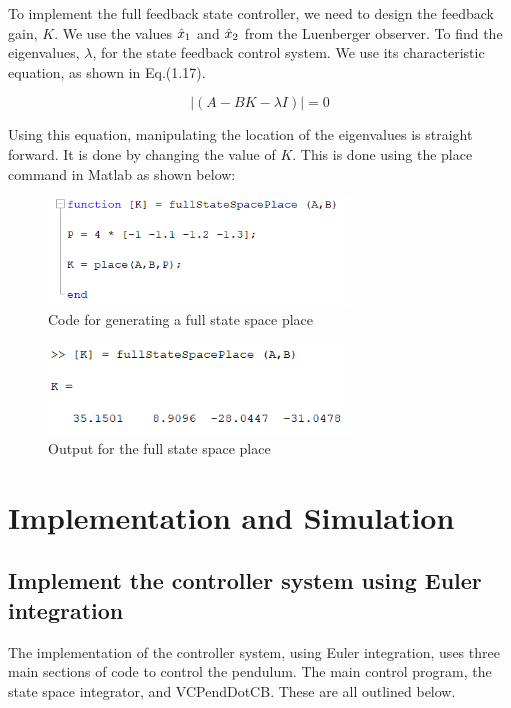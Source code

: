 \documentclass[11pt]{report}
\begin{document}
To implement the full feedback state controller, we need to design the feedback gain, $K$. We use the values $\hat{x}\textsubscript{1}$ and $\hat{x}\textsubscript{2}$ from the Luenberger observer. To find the eigenvalues, $\lambda$, for the state feedback control system. We use its characteristic equation, as shown in Eq.(1.17). 

\begin{equation}
|(A-BK-{\lambda}I)| = 0
\end{equation}

Using this equation, manipulating the location of the eigenvalues is straight forward. It is done by changing the value of $K$. This is done using the place command in Matlab as shown below:

\begin{figure}[H]
\centerline{\includegraphics[width=8cm]{fullStateSpacePlace.png}}
\caption{Code for generating a full state space place}
\label{fig}
\end{figure}

\begin{figure}[H]
\centerline{\includegraphics[width=8cm]{fullStateSpacePlaceOutput.png}}
\caption{Output for the full state space place}
\label{fig}
\end{figure}


\chapter{Implementation and Simulation}

\section{Implement the controller system using Euler integration}

The implementation of the controller system, using Euler integration, uses three main sections of code to control the pendulum. The main control program, the state space integrator, and VCPendDotCB. These are all outlined below.  
\end{document}
